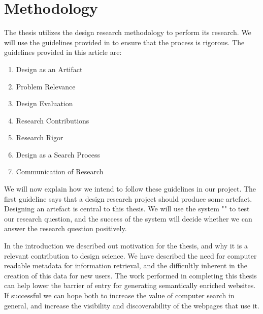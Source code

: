 
\chapter{Methodology} %

\label{Methodology} %


The thesis utilizes the design research methodology to perform its research.
We will use the guidelines provided in \citet{Hevner2004} to ensure that the process is rigorous.
The guidelines provided in this article are:
\begin{enumerate}
	\item \label{gl1}Design as an Artifact
	\item \label{gl2}Problem Relevance
	\item \label{gl3}Design Evaluation
	\item \label{gl4}Research Contributions
	\item \label{gl5}Research Rigor
	\item \label{gl6}Design as a Search Process
	\item \label{gl7}Communication of Research
\end{enumerate}

We will now explain how we intend to follow these guidelines in our project.
The first guideline says that a design research project should produce some artefact.
Designing an artefact is central to this thesis.
We will use the system "\theartefact" to test our research question,
and the success of the system will decide whether we can answer the research question positively.

In the introduction we described out motivation for the thesis, and why it is a relevant contribution to design science.
We have described the need for computer readable metadata for information retrieval,
and the difficultly inherent in the creation of this data for new users.
The work performed in completing this thesis can help lower the barrier of entry for generating semantically enriched websites.
If successful we can hope both to increase the value of computer search in general, and increase the visibility and
discoverability of the webpages that use it.

